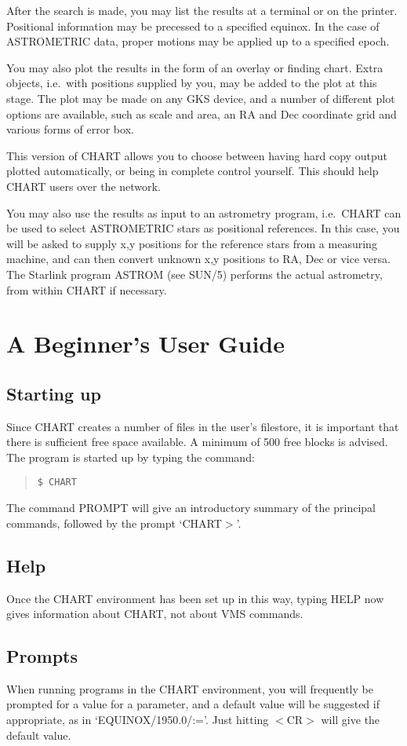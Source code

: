 After the search is made, you may list the results at a terminal or on the
printer.
Positional information may be precessed to a specified equinox.
In the case of ASTROMETRIC data, proper motions may be applied up to a specified
epoch.

You may also plot the results in the form of an overlay or finding chart.
Extra objects, i.e.\ with positions supplied by you, may be added to the plot at
this stage.
The plot may be made on any GKS device, and a number of different plot options
are available, such as scale and area, an RA and Dec coordinate grid and various
forms of error box.

This version of CHART allows you to choose between having hard copy 
output plotted automatically, or being in complete control yourself.
This should help CHART users over the network.

You may also use the results as input to an astrometry program, i.e.\ CHART
can be used to select ASTROMETRIC stars as positional references.
In this case, you will be asked to supply x,y positions for the reference
stars from a measuring machine, and can then convert unknown x,y positions to
RA, Dec or vice versa.
The Starlink program ASTROM (see SUN/5) performs the actual astrometry, from
within CHART if necessary.
\section{A Beginner's User Guide}
\subsection{Starting up}
Since CHART creates a number of files in the user's filestore, it is important
that there is sufficient free space available.
A minimum of 500 free blocks is advised.
The program is started up by typing the command:
\begin{quote}
{\tt \$ CHART}
\end{quote}
The command PROMPT will give an introductory summary of the principal commands,
followed by the prompt `CHART$>$'.
\subsection{Help}
Once the CHART environment has been set up in this way, typing HELP now gives
information about CHART, not about VMS commands.
\subsection{Prompts}
When running programs in the CHART environment, you will frequently be prompted
for a value for a parameter, and a default value will be suggested if
appropriate, as in `EQUINOX/1950.0/:='.
Just hitting $<$CR$>$ will give the default value.

